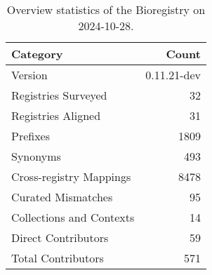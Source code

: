 \begin{table}
\caption{Overview statistics of the Bioregistry on 2024-10-28.}
\label{tab:bioregistry-summary}
\begin{tabular}{lr}
\toprule
Category & Count \\
\midrule
Version & 0.11.21-dev \\
Registries Surveyed & 32 \\
Registries Aligned & 31 \\
Prefixes & 1809 \\
Synonyms & 493 \\
Cross-registry Mappings & 8478 \\
Curated Mismatches & 95 \\
Collections and Contexts & 14 \\
Direct Contributors & 59 \\
Total Contributors & 571 \\
\bottomrule
\end{tabular}
\end{table}
